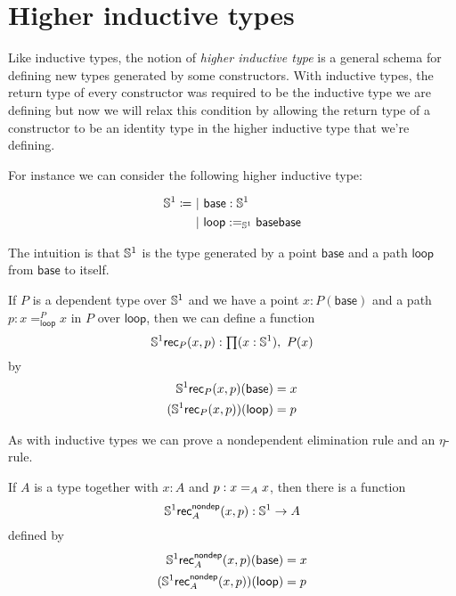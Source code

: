 \newcommand{\base}{\ensuremath{\mathsf{base}}\xspace}
\newcommand{\lloop}{\ensuremath{\mathsf{loop}}\xspace}
\newcommand{\seg}{\ensuremath{\mathsf{seg}}\xspace}
\newcommand{\eqtopath}{\ensuremath{\mathsf{eqtopath}}\xspace}

\chapter{Higher inductive types}
\label{cha:hits}

Like inductive types, the notion of \emph{higher inductive type} is a general
schema for defining new types generated by some constructors. With inductive
types, the return type of every constructor was required to be the inductive
type we are defining but now we will relax this condition by allowing the return
type of a constructor to be an identity type in the higher inductive type that
we’re defining.

For instance we can consider the following higher inductive type:

\begin{align*}
  \Sn^1 \defeq&\ |\ \base:\Sn^1 \\
  &\ |\ \lloop:\id[\Sn^1]\base\base
\end{align*}

The intuition is that $\Sn^1$ is the type generated by a point \base and a path
\lloop from \base to itself.

If $P$ is a dependent type over $\Sn^1$ and we have a point $x:P(\base)$ and a
path $p:x=^P_\lloop{}x$ in $P$ over $\lloop$, then we can define a function
\[\Sn^1\mathsf{rec}_P(x,p):\prd{x:\Sn^1}P(x)\]
by
\begin{align*}
  \Sn^1\mathsf{rec}_P(x,p)(\base)&=x \\
  \map{(\Sn^1\mathsf{rec}_P(x,p))}{\lloop}&=p
\end{align*}

As with inductive types we can prove a nondependent elimination rule and an
$\eta$-rule.

\begin{lem}
  If $A$ is a type together with $x:A$ and $p:\id[A]xx$, then there is a
  function
  \[\Sn^1\mathsf{rec}^{\mathsf{nondep}}_A(x,p):\Sn^1\to{}A\]
  defined by
  \begin{align*}
    \Sn^1\mathsf{rec}^{\mathsf{nondep}}_A(x,p)(\base)&=x \\
    \map{(\Sn^1\mathsf{rec}^{\mathsf{nondep}}_A(x,p))}{\lloop}&=p
  \end{align*}
\end{lem}


